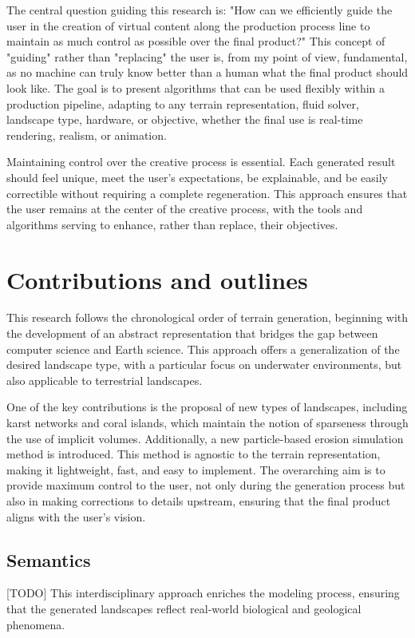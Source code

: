 The central question guiding this research is: "How can we efficiently guide the user in the creation of virtual content along the production process line to maintain as much control as possible over the final product?" This concept of "guiding" rather than "replacing" the user is, from my point of view, fundamental, as no machine can truly know better than a human what the final product should look like. The goal is to present algorithms that can be used flexibly within a production pipeline, adapting to any terrain representation, fluid solver, landscape type, hardware, or objective, whether the final use is real-time rendering, realism, or animation.

Maintaining control over the creative process is essential. Each generated result should feel unique, meet the user's expectations, be explainable, and be easily correctible without requiring a complete regeneration. This approach ensures that the user remains at the center of the creative process, with the tools and algorithms serving to enhance, rather than replace, their objectives.

\section{Contributions and outlines}
This research follows the chronological order of terrain generation, beginning with the development of an abstract representation that bridges the gap between computer science and Earth science. This approach offers a generalization of the desired landscape type, with a particular focus on underwater environments, but also applicable to terrestrial landscapes.

One of the key contributions is the proposal of new types of landscapes, including karst networks and coral islands, which maintain the notion of sparseness through the use of implicit volumes. Additionally, a new particle-based erosion simulation method is introduced. This method is agnostic to the terrain representation, making it lightweight, fast, and easy to implement. The overarching aim is to provide maximum control to the user, not only during the generation process but also in making corrections to details upstream, ensuring that the final product aligns with the user's vision.

\subsection{Semantics}
[TODO]
This interdisciplinary approach enriches the modeling process, ensuring that the generated landscapes reflect real-world biological and geological phenomena.

